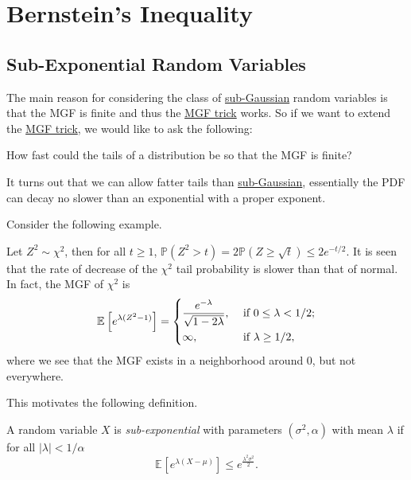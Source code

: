 \section{Bernstein's Inequality}
\subsection{Sub-Exponential Random Variables}
The main reason for considering the class of \hyperref[def:sub-Gaussian]{sub-Gaussian} random variables is that the MGF is finite and thus the \hyperref[lma:MGF-trick]{MGF trick} works. So if we want to extend the \hyperref[lma:MGF-trick]{MGF trick}, we would like to ask the following:

\begin{problem*}
	How fast could the tails of a distribution be so that the MGF is finite?
\end{problem*}
\begin{answer}
	It turns out that we can allow fatter tails than \hyperref[def:sub-Gaussian]{sub-Gaussian}, essentially the PDF can decay no slower than an exponential with a proper exponent.
\end{answer}

Consider the following example.

\begin{eg}
	Let \(Z^2 \sim \chi ^2\), then for all \(t \geq 1\), \(\mathbb{P} (Z^2 > t) = 2\mathbb{P} (Z \geq \sqrt{t} ) \leq 2 e^{-t / 2}\). It is seen that the rate of decrease of the \(\chi ^2\) tail probability is slower than that of normal. In fact, the MGF of \(\chi ^{2} \) is
	\[
		\mathbb{E}_{}\left[e^{\lambda (Z^2 - 1)} \right] =
		\begin{dcases}
			\frac{e^{-\lambda }}{\sqrt{1 - 2 \lambda } }, & \text{ if } 0 \leq \lambda < 1 / 2 ; \\
			\infty ,                                      & \text{ if } \lambda  \geq 1 / 2 ,
		\end{dcases}
	\]
	where we see that the MGF exists in a neighborhood around \(0\), but not everywhere.
\end{eg}

This motivates the following definition.

\begin{definition}\label{def:sub-exponential}
	A random variable \(X\) is \emph{sub-exponential} with parameters \((\sigma ^{2} , \alpha )\) with mean \(\lambda \) if for all \(\vert \lambda  \vert < 1 / \alpha \)
	\[
		\mathbb{E}_{}\left[e^{\lambda (X - \mu )} \right] \leq e^{\frac{\lambda ^{2} \sigma ^{2} }{2}}.
	\]
\end{definition}


